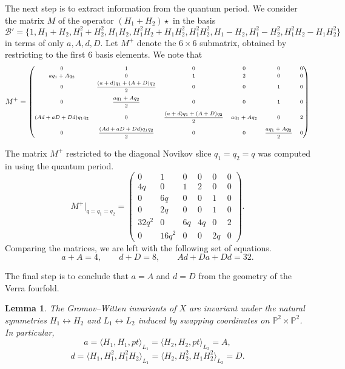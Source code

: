 \documentclass[11pt]{amsart}
\theoremstyle{plain}
\newtheorem{lemma}[theorem]{Lemma}
\numberwithin{equation}{section}
\theoremstyle{definition}
\theoremstyle{remark}
\renewcommand{\P}{\mathbb P}
\begin{document}
The next step is to extract information from the quantum period. We consider the matrix $M$ of the operator $(H_1+H_2) \star$ in the basis 
\[
\mathcal{B}' = \{ 1, H_1 +H_2, H_1^2 + H_2^2,  H_1 H_2,H_1^2H_2 + H_1H_2^2, H_1^2H_2^2, H_1 - H_2 ,H_1^2 - H_2^2, H_1^2H_2 - H_1H_2^2\}
\]
in terms of only $a,A,d,D$.
Let $M^+$ denote the $6\times 6$ submatrix, obtained by restricting to the first $6$ basis elements. We note that
\[
\scriptsize
M^{+}=
\begin{pmatrix}
0 & 1 & 0 & 0 & 0 & 0 \\[2pt]
a q_1 + A q_2 & 0 & 1 & 2 & 0 & 0 \\[2pt]
0 & \dfrac{(a+d)q_1+(A+D)q_2}{2} & 0 & 0 & 1 & 0 \\[8pt]
0 & \dfrac{a q_1+A q_2}{2} & 0 & 0 & 1 & 0 \\[8pt]
(Ad+aD+Dd)q_1q_2 & 0 & \dfrac{(a+d)q_1+(A+D)q_2}{2} & a q_1+A q_2 & 0 & 2 \\[8pt]
0 & \dfrac{(Ad+aD+Dd)q_1q_2}{2} & 0 & 0 & \dfrac{a q_1+A q_2}{2} & 0
\end{pmatrix}
\]

The matrix $M^+$ restricted to the diagonal Novikov slice \(q_1=q_2=q\) was computed in \cite{Fay26} using the quantum period. 
\[
M^+|_{q=q_1 =q_2} =
\begin{pmatrix}
0 & 1 & 0 & 0 & 0 & 0 \\
4q & 0 & 1 & 2 & 0 & 0 \\
0 & 6q & 0 & 0 & 1 & 0 \\
0 & 2q & 0 & 0 & 1 & 0 \\
32q^2 & 0 & 6q & 4q & 0 & 2 \\
0 & 16q^2 & 0 & 0 & 2q & 0
\end{pmatrix}.
\]
Comparing the matrices, 
we are left with the following set of equations.
\[
a+A=4,\qquad d+D=8,\qquad Ad+Da+Dd=32.
\]

The final step is to conclude that $a=A$ and $d=D$ from the geometry of the Verra fourfold.

\begin{lemma}
The Gromov--Witten invariants of $X$ are invariant under the natural symmetries $H_1 \leftrightarrow H_2$ and $L_1 \leftrightarrow L_2$ induced by swapping coordinates on $\P^2 \times \P^2$.
In particular,
\[
a= \langle H_1, H_1, pt\rangle_{L_1} = \langle H_2, H_2, pt\rangle _{L_2} = A,
\]
\[
d= \langle H_1, H_1^2, H_1^2H_2\rangle_{L_1} = \langle H_2, H_2^2 ,H_1H_2^2\rangle_{L_2} = D.
\]

\end{lemma}
\end{document}
